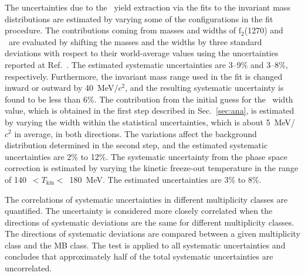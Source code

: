 The uncertainties due to the \fzero~yield extraction via the fits to the invariant mass distributions are estimated by varying some of the configurations in the fit procedure. The contributions coming from masses and widths of $\mathrm{f}_{2}$(1270) and \rhoz~are evaluated by shifting the masses and the widths by three standard deviations with respect to their world-average values using the uncertainties reported at Ref.~\cite{ParticleDataGroup:2022pth}. The estimated systematic uncertainties are 3--9\% and 3--8\%, respectively. Furthermore, the invariant mass range used in the fit is changed inward or outward by 40~MeV$/c^{2}$, and the resulting systematic uncertainty is found to be less than 6\%. The contribution from the initial guess for the \fzero~width value, which is obtained in the first step described in Sec.~\ref{sec:ana}, is estimated by varying the width within the statistical uncertainties, which is about 5~MeV/$c{^2}$ in average, in both directions. The variations affect the background distribution determined in the second step, and the estimated systematic uncertainties are 2\% to 12\%. The systematic uncertainty from the phase space correction is estimated by varying the kinetic freeze-out temperature in the range of 140~$<T_{\mathrm{kin}}<$~180~MeV. The estimated uncertainties are 3\% to 8\%. 

The correlations of systematic uncertainties in different multiplicity classes are quantified. The uncertainty is considered more closely correlated when the directions of systematic deviations are the same for different multiplicity classes. The directions of systematic deviations are compared between a given multiplicity class and the MB class. The test is applied to all systematic uncertainties and concludes that approximately half of the total systematic uncertainties are uncorrelated.